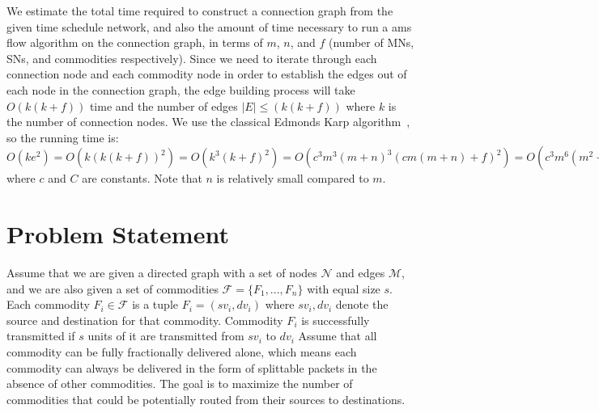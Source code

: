 \documentclass[conference]{IEEEtran}
\begin{document}
{We estimate the total time required to construct a connection graph from the given time schedule network, and also the amount of time necessary to run a ams flow algorithm on the connection graph, in terms of $m$, $n$, and $f$ (number of MNs, SNs, and commodities respectively).  Since we need to iterate through each connection node and each commodity node in order to establish the edges out of each node in the connection graph, the edge building process will take $O(k(k+f))$ time and the number of edges $|E| \leq (k(k+f))$ where $k$ is the number of connection nodes.
We use the classical Edmonds Karp algorithm~\cite{edmonds}, so the running time is:
$O(ke^2)=O(k(k(k+f))^2)=O(k^3(k+f)^2) =O(c^3m^3(m+n)^3(cm(m+n)+f)^2)=O(c^3m^6(m^2+f)^2)=O(Cm^6(m^4+2m^2f+f^2))$ where $c$ and $C$ are constants. Note that $n$ is relatively small compared to $m$. 
}



\section{Problem Statement} \label{problem}

Assume that we are given a directed graph with a set of nodes $\mathcal N$ and edges $\mathcal M$, and we are also given a set of commodities $\mathcal F = \{F_1, ..., F_n\}$ with equal size $s$. Each commodity $F_i \in \mathcal F$ is a tuple $F_i=(sv_i, dv_i)$ where $sv_i, dv_i$ denote the source and destination for that commodity. Commodity $F_i$ is successfully transmitted if $s$ units of it are transmitted from $sv_i$ to $dv_i$
Assume that all commodity can be fully fractionally delivered alone, which means each commodity can always be delivered in the form of splittable packets in the absence of other commodities. The goal is to maximize the number of commodities that could be potentially routed from their sources to destinations.
\end{document}
